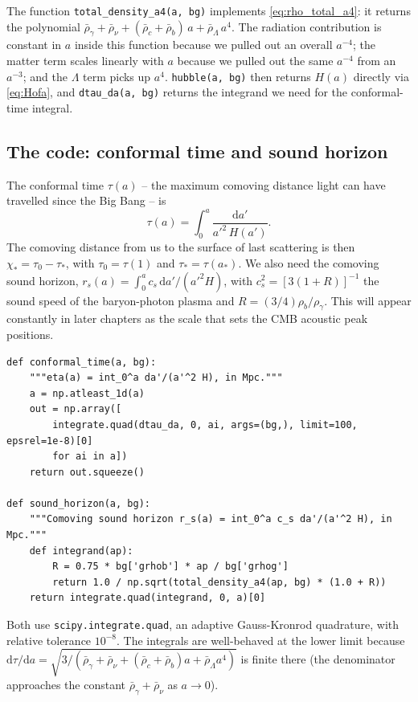 \noindent The function \texttt{total\_density\_a4(a, bg)} implements \cref{eq:rho_total_a4}: it returns the polynomial $\bar\rho_\gamma + \bar\rho_\nu + (\bar\rho_c + \bar\rho_b)\, a + \bar\rho_\Lambda\, a^4$. The radiation contribution is constant in $a$ inside this function because we pulled out an overall $a^{-4}$; the matter term scales linearly with $a$ because we pulled out the same $a^{-4}$ from an $a^{-3}$; and the $\Lambda$ term picks up $a^4$. \texttt{hubble(a, bg)} then returns $H(a)$ directly via \cref{eq:Hofa}, and \texttt{dtau\_da(a, bg)} returns the integrand we need for the conformal-time integral.

\subsection{The code: conformal time and sound horizon}

The conformal time $\tau(a)$ -- the maximum comoving distance light can have travelled since the Big Bang -- is
\[
  \tau(a) = \int_0^a \frac{\mathrm{d}a'}{a'^2\, H(a')}.
\]
The comoving distance from us to the surface of last scattering is then $\chi_* = \tau_0 - \tau_*$, with $\tau_0 = \tau(1)$ and $\tau_* = \tau(a_*)$. We also need the comoving sound horizon, $r_s(a) = \int_0^a c_s\,\mathrm{d}a'/(a'^2 H)$, with $c_s^2 = [3(1 + R)]^{-1}$ the sound speed of the baryon-photon plasma and $R = (3/4)\rho_b/\rho_\gamma$. This will appear constantly in later chapters as the scale that sets the CMB acoustic peak positions.

\begin{codebox}
\begin{lstlisting}[style=python]
def conformal_time(a, bg):
    """eta(a) = int_0^a da'/(a'^2 H), in Mpc."""
    a = np.atleast_1d(a)
    out = np.array([
        integrate.quad(dtau_da, 0, ai, args=(bg,), limit=100, epsrel=1e-8)[0]
        for ai in a])
    return out.squeeze()

def sound_horizon(a, bg):
    """Comoving sound horizon r_s(a) = int_0^a c_s da'/(a'^2 H), in Mpc."""
    def integrand(ap):
        R = 0.75 * bg['grhob'] * ap / bg['grhog']
        return 1.0 / np.sqrt(total_density_a4(ap, bg) * (1.0 + R))
    return integrate.quad(integrand, 0, a)[0]
\end{lstlisting}
\end{codebox}

\noindent Both use \texttt{scipy.integrate.quad}, an adaptive Gauss-Kronrod quadrature, with relative tolerance $10^{-8}$. The integrals are well-behaved at the lower limit because $\mathrm{d}\tau/\mathrm{d}a = \sqrt{3/(\bar\rho_\gamma + \bar\rho_\nu + (\bar\rho_c + \bar\rho_b)a + \bar\rho_\Lambda a^4)}$ is finite there (the denominator approaches the constant $\bar\rho_\gamma + \bar\rho_\nu$ as $a \to 0$).

